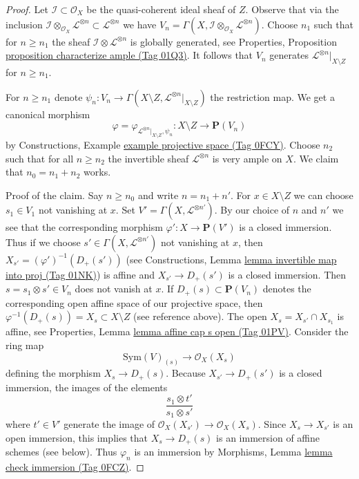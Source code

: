 \documentclass{amsart}
\theoremstyle{plain}
\theoremstyle{definition}
\theoremstyle{remark}
\numberwithin{equation}{subsection}
\begin{document}
\begin{proof}
Let $\mathcal{I} \subset \mathcal{O}_X$ be the quasi-coherent ideal sheaf of
$Z$. Observe that via the inclusion
$\mathcal{I} \otimes_{\mathcal{O}_X} \mathcal{L}^{\otimes n} \subset
\mathcal{L}^{\otimes n}$ we have
$V_n = \Gamma(X, \mathcal{I} \otimes_{\mathcal{O}_X} \mathcal{L}^{\otimes n})$.
Choose $n_1$ such that for $n \geq n_1$ the sheaf
$\mathcal{I} \otimes \mathcal{L}^{\otimes n}$ is globally generated, see
Properties, Proposition \href{https://stacks.math.columbia.edu/tag/01Q3}{proposition characterize ample (Tag 01Q3)}.
It follows that $V_n$ generates $\mathcal{L}^{\otimes n}|_{X \setminus Z}$
for $n \geq n_1$.

\medskip\noindent
For $n \geq n_1$ denote
$\psi_n : V_n \to
\Gamma(X \setminus Z, \mathcal{L}^{\otimes n}|_{X \setminus Z})$
the restriction map. We get a canonical morphism
$$
\varphi = \varphi_{\mathcal{L}^{\otimes n}|_{X \setminus Z}, \psi_n} :
X \setminus Z
\longrightarrow
\mathbf{P}(V_n)
$$
by Constructions, Example \href{https://stacks.math.columbia.edu/tag/0FCY}{example projective space (Tag 0FCY)}.
Choose $n_2$ such that for all $n \geq n_2$ the invertible sheaf
$\mathcal{L}^{\otimes n}$ is very ample on $X$.
We claim that $n_0 = n_1 + n_2$ works.

\medskip\noindent
Proof of the claim. Say $n \geq n_0$ and write $n = n_1 + n'$.
For $x \in X \setminus Z$ we can choose $s_1 \in V_1$ not
vanishing at $x$. Set $V' = \Gamma(X, \mathcal{L}^{\otimes n'})$.
By our choice of $n$ and $n'$ we see that the corresponding morphism
$\varphi' : X \to \mathbf{P}(V')$ is a closed immersion. Thus if we choose
$s' \in \Gamma(X, \mathcal{L}^{\otimes n'})$ not vanishing at $x$,
then $X_{s'} = (\varphi')^{-1}(D_+(s'))$ (see
Constructions, Lemma \href{https://stacks.math.columbia.edu/tag/01NK}{lemma invertible map into proj (Tag 01NK)})
is affine and $X_{s'} \to D_+(s')$ is a closed immersion.
Then $s = s_1 \otimes s' \in V_n$ does not vanish at $x$.
If $D_+(s) \subset \mathbf{P}(V_n)$ denotes the
corresponding open affine space of our projective space, then
$\varphi^{-1}(D_+(s)) = X_s \subset X \setminus Z$ (see reference above).
The open $X_s = X_{s'} \cap X_{s_1}$ is affine, see
Properties, Lemma \href{https://stacks.math.columbia.edu/tag/01PV}{lemma affine cap s open (Tag 01PV)}.
Consider the ring map
$$
\text{Sym}(V)_{(s)} \longrightarrow \mathcal{O}_X(X_s)
$$
defining the morphism $X_s \to D_+(s)$. Because $X_{s'} \to D_+(s')$
is a closed immersion, the images of the elements
$$
\frac{s_1 \otimes t'}{s_1 \otimes s'}
$$
where $t' \in V'$ generate the image of
$\mathcal{O}_X(X_{s'}) \to \mathcal{O}_X(X_s)$.
Since $X_s \to X_{s'}$ is an open immersion,
this implies that $X_s \to D_+(s)$ is an immersion of affine schemes
(see below). Thus $\varphi_n$ is an immersion by
Morphisms, Lemma \href{https://stacks.math.columbia.edu/tag/0FCZ}{lemma check immersion (Tag 0FCZ)}.


\end{proof}
\end{document}
